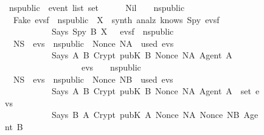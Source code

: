 %
\begin{isabellebody}%
\def\isabellecontext{NS{\isacharunderscore}Public}%
%
\isadelimtheory
%
\endisadelimtheory
%
\isatagtheory
%
\endisatagtheory
{\isafoldtheory}%
%
\isadelimtheory
%
\endisadelimtheory
%
\isamarkuptrue%
%
\begin{figure}
\begin{isabelle}
\isamarkupfalse%
\ ns{\isacharunderscore}public\ {\isacharcolon}{\isacharcolon}\ {\isachardoublequoteopen}event\ list\ set{\isachardoublequoteclose}\isanewline
\ \ \isanewline
\isanewline
\ \ \ Nil{\isacharcolon}\ \ {\isachardoublequoteopen}{\isacharbrackleft}{\isacharbrackright}\ {\isasymin}\ ns{\isacharunderscore}public{\isachardoublequoteclose}\isanewline
\isanewline
\isanewline
\ {\isacharbar}\ Fake{\isacharcolon}\ {\isachardoublequoteopen}{\isasymlbrakk}evsf\ {\isasymin}\ ns{\isacharunderscore}public{\isacharsemicolon}\ \ X\ {\isasymin}\ synth\ {\isacharparenleft}analz\ {\isacharparenleft}knows\ Spy\ evsf{\isacharparenright}{\isacharparenright}{\isasymrbrakk}\isanewline
\ \ \ \ \ \ \ \ \ \ {\isasymLongrightarrow}\ Says\ Spy\ B\ X\ \ {\isacharhash}\ evsf\ {\isasymin}\ ns{\isacharunderscore}public{\isachardoublequoteclose}\isanewline
\isanewline
\isanewline
\ {\isacharbar}\ NS{}{\isacharcolon}\ \ {\isachardoublequoteopen}{\isasymlbrakk}evs{}\ {\isasymin}\ ns{\isacharunderscore}public{\isacharsemicolon}\ \ Nonce\ NA\ {\isasymnotin}\ used\ evs{}{\isasymrbrakk}\isanewline
\ \ \ \ \ \ \ \ \ \ {\isasymLongrightarrow}\ Says\ A\ B\ {\isacharparenleft}Crypt\ {\isacharparenleft}pubK\ B{\isacharparenright}\ {\isasymlbrace}Nonce\ NA{\isacharcomma}\ Agent\ A{\isasymrbrace}{\isacharparenright}\isanewline
\ \ \ \ \ \ \ \ \ \ \ \ \ \ \ \ \ {\isacharhash}\ evs{}\ \ {\isasymin}\ \ ns{\isacharunderscore}public{\isachardoublequoteclose}\isanewline
\isanewline
\isanewline
\ {\isacharbar}\ NS{}{\isacharcolon}\ \ {\isachardoublequoteopen}{\isasymlbrakk}evs{}\ {\isasymin}\ ns{\isacharunderscore}public{\isacharsemicolon}\ \ Nonce\ NB\ {\isasymnotin}\ used\ evs{}{\isacharsemicolon}\isanewline
\ \ \ \ \ \ \ \ \ \ \ Says\ A{\isacharprime}\ B\ {\isacharparenleft}Crypt\ {\isacharparenleft}pubK\ B{\isacharparenright}\ {\isasymlbrace}Nonce\ NA{\isacharcomma}\ Agent\ A{\isasymrbrace}{\isacharparenright}\ {\isasymin}\ set\ evs{}{\isasymrbrakk}\isanewline
\ \ \ \ \ \ \ \ \ \ {\isasymLongrightarrow}\ Says\ B\ A\ {\isacharparenleft}Crypt\ {\isacharparenleft}pubK\ A{\isacharparenright}\ {\isasymlbrace}Nonce\ NA{\isacharcomma}\ Nonce\ NB{\isacharcomma}\ Agent\ B{\isasymrbrace}{\isacharparenright}\isanewline

\end{isabelle}
\end{figure}
\end{isabellebody}
